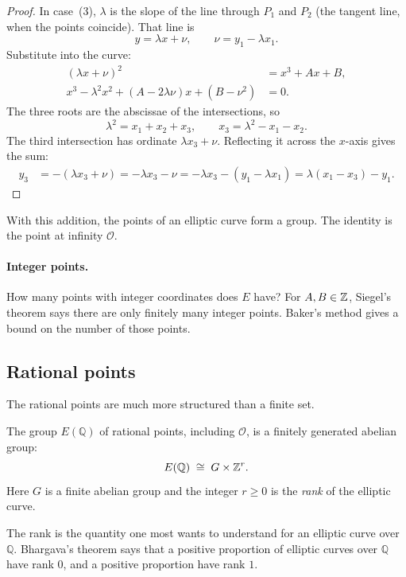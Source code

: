 \begin{proof}
In case~(3), $\lambda$ is the slope of the line through $P_1$ and $P_2$ (the tangent line, when the points coincide). That line is
\[
    y=\lambda x+\nu,
    \qquad
    \nu=y_1-\lambda x_1.
\]
Substitute into the curve:
\begin{align*}
    (\lambda x+\nu)^2&=x^3+Ax+B,\\
    x^3-\lambda^2 x^2+(A-2\lambda\nu)x+(B-\nu^2)&=0.
\end{align*}
The three roots are the abscissae of the intersections, so
\[
    \lambda^2=x_1+x_2+x_3,
    \qquad
    x_3=\lambda^2-x_1-x_2.
\]
The third intersection has ordinate $\lambda x_3+\nu$. Reflecting it across the $x$-axis gives the sum:
\begin{align*}
    y_3
    &=-(\lambda x_3+\nu)
     =-\lambda x_3-\nu
     =-\lambda x_3-(y_1-\lambda x_1)
     =\lambda(x_1-x_3)-y_1.
\end{align*}
\end{proof}

With this addition, the points of an elliptic curve form a group. The identity is the point at infinity $\mathcal{O}$.

\paragraph{Integer points.}
How many points with integer coordinates does $E$ have? For $A,B\in\mathbb Z$, Siegel's theorem says there are only finitely many integer points. Baker's method gives a bound on the number of those points.


\subsection{Rational points}

The rational points are much more structured than a finite set.

\begin{theorem}
The group $E(\mathbb{Q})$ of rational points, including $\mathcal{O}$, is a finitely generated abelian group:
\[
    E(\mathbb{Q})\;\cong\; G\times \mathbb Z^{r}.
\]
Here $G$ is a finite abelian group and the integer $r\geq 0$ is the \emph{rank} of the elliptic curve.
\end{theorem}

The rank is the quantity one most wants to understand for an elliptic curve over $\mathbb{Q}$. Bhargava's theorem says that a positive proportion of elliptic curves over $\mathbb{Q}$ have rank $0$, and a positive proportion have rank $1$.

